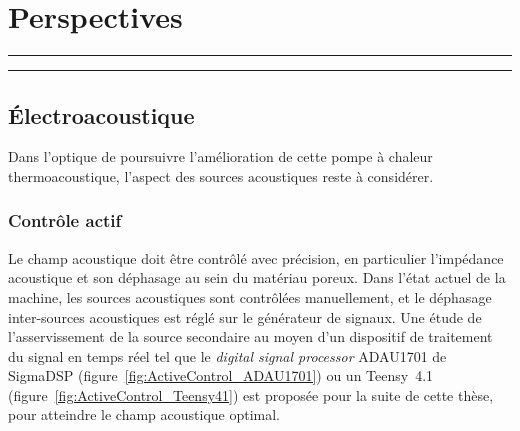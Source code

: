 \chapter{Perspectives}\label{chap:Persp}%
\vfill
\hrule \vspace{.5cm}
{\hypersetup{linkcolor = black}
\localtableofcontents
}%
\vspace{.5cm} \hrule
\vfill
\clearpage




\section{\'Electroacoustique}

Dans l'optique de poursuivre l'amélioration de cette pompe à chaleur thermoacoustique, l'aspect des sources acoustiques reste à considérer.

\subsection{Contrôle actif}
Le champ acoustique doit être contrôlé avec précision, en particulier l'impédance acoustique et son déphasage au sein du matériau poreux. Dans l'état actuel de la machine, les sources acoustiques sont contrôlées manuellement, et le déphasage inter-sources acoustiques est réglé sur le générateur de signaux. Une étude de l'asservissement de la source secondaire au moyen d'un dispositif de traitement du signal en temps réel tel que le \textit{digital signal processor} ADAU1701 de SigmaDSP (figure~\ref{fig:ActiveControl_ADAU1701}) ou un Teensy~4.1 (figure~\ref{fig:ActiveControl_Teensy41}) est proposée pour la suite de cette thèse, pour atteindre le champ acoustique optimal.



